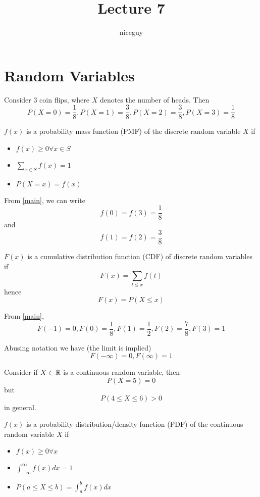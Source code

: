\documentclass[12pt]{article}
\author{niceguy}
\title{Lecture 7}
\begin{document}
\maketitle

\section{Random Variables}

\begin{ex}\label{main}
	Consider 3 coin flips, where $X$ denotes the number of heads. Then
	$$P(X=0) = \frac{1}{8}, P(X=1) = \frac{3}{8}, P(X=2) = \frac{3}{8}, P(X=3) = \frac{1}{8}$$
\end{ex}

\begin{defn}
	$f(x)$ is a probability mass function (PMF) of the discrete random variable $X$ if
	\begin{itemize}
		\item $f(x) \geq 0\forall x \in S$
		\item $\sum_{x\in S}f(x) = 1$
		\item $P(X=x) = f(x)$
	\end{itemize}
\end{defn}

\begin{ex}
	From \ref{main}, we can write
	$$f(0)=f(3) = \frac{1}{8}$$
	and
	$$f(1) = f(2) = \frac{3}{8}$$
\end{ex}

\begin{defn}
	$F(x)$ is a cumulative distribution function (CDF) of discrete random variables if
	$$F(x) = \sum_{t\leq x} f(t)$$
	hence
	$$F(x) = P(X\leq x)$$
\end{defn}

\begin{ex}
	From \ref{main},
	$$F(-1) = 0, F(0) = \frac{1}{8}, F(1) = \frac{1}{2}, F(2) = \frac{7}{8}, F(3) = 1$$
\end{ex}

Abusing notation we have (the limit is implied)
$$F(-\infty) = 0, F(\infty) = 1$$

Consider if $X\in\mathbb{R}$ is a continuous random variable, then
$$P(X=5)=0$$
but
$$P(4\leq X\leq6) > 0$$
in general.

\begin{defn}
	$f(x)$ is a probability distribution/density function (PDF) of the continuous random variable $X$ if
	\begin{itemize}
		\item $f(x)\geq 0\forall x$
		\item $\int_{-\infty}^\infty f(x)dx = 1$
		\item $P(a\leq X\leq b) = \int_a^b f(x)dx$
	\end{itemize}
\end{defn}
\end{document}
